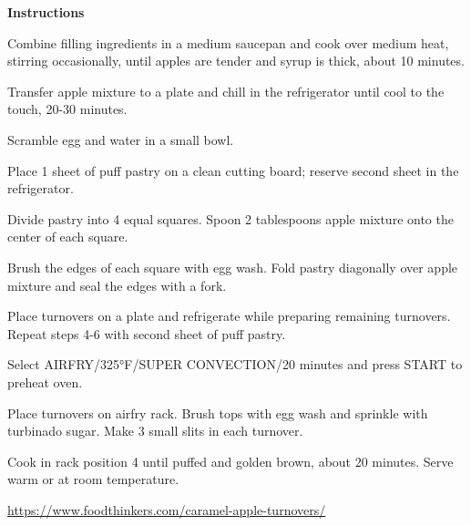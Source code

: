 \documentclass[../book.tex]{subfiles}
\begin{document}
  \begin{minipage}[t]{0.6\textwidth}
    {\bfseries\large Instructions}
    \begin{myMethod}
      \item Combine filling ingredients in a medium saucepan and cook over medium heat, stirring occasionally, until apples are tender and syrup is thick, about 10 minutes.
      \item Transfer apple mixture to a plate and chill in the refrigerator until cool to the touch, 20-30 minutes.
      \item Scramble egg and water in a small bowl.
      \item Place 1 sheet of puff pastry on a clean cutting board; reserve second sheet in the refrigerator.
      \item Divide pastry into 4 equal squares. Spoon 2 tablespoons apple mixture onto the center of each square.
      \item Brush the edges of each square with egg wash. Fold pastry diagonally over apple mixture and seal the edges with a fork.
      \item Place turnovers on a plate and refrigerate while preparing remaining turnovers. Repeat steps 4-6 with second sheet of puff pastry.
      \item Select AIRFRY/325°F/SUPER CONVECTION/20 minutes and press START to preheat oven.
      \item Place turnovers on airfry rack. Brush tops with egg wash and sprinkle with turbinado sugar. Make 3 small slits in each turnover.
      \item Cook in rack position 4 until puffed and golden brown, about 20 minutes. Serve warm or at room temperature.
      \end{myMethod}
      \vspace{2mm}
    \end{minipage}
\vfill
\centering\url{https://www.foodthinkers.com/caramel-apple-turnovers/}
\end{document}
